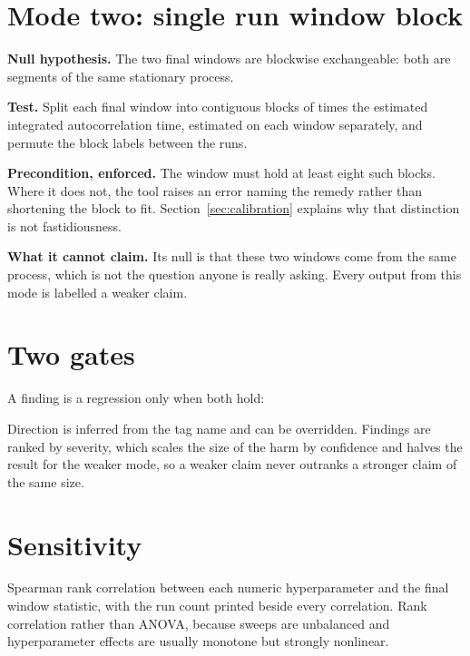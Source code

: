 \documentclass[11pt,a4paper]{report}
\begin{document}
\section{Mode two: single run window block}

\textbf{Null hypothesis.} The two final windows are blockwise exchangeable: both
are segments of the same stationary process.

\textbf{Test.} Split each final window into contiguous blocks of
\factblocktaumultiplier{} times the estimated integrated autocorrelation time,
estimated on each window separately, and permute the block labels between the
runs.

\textbf{Precondition, enforced.} The window must hold at least eight such blocks.
Where it does not, the tool raises an error naming the remedy rather than
shortening the block to fit. Section~\ref{sec:calibration} explains why that
distinction is not fastidiousness.

\textbf{What it cannot claim.} Its null is that these two windows come from the
same process, which is not the question anyone is really asking. Every output
from this mode is labelled a weaker claim.

\section{Two gates}

A finding is a regression only when both hold:

\begin{quote}\small\factgates\end{quote}

Direction is inferred from the tag name and can be overridden. Findings are
ranked by severity, which scales the size of the harm by confidence and halves
the result for the weaker mode, so a weaker claim never outranks a stronger claim
of the same size.

\section{Sensitivity}

Spearman rank correlation between each numeric hyperparameter and the final
window statistic, with the run count printed beside every correlation. Rank
correlation rather than ANOVA, because sweeps are unbalanced and hyperparameter
effects are usually monotone but strongly nonlinear.

\end{document}
